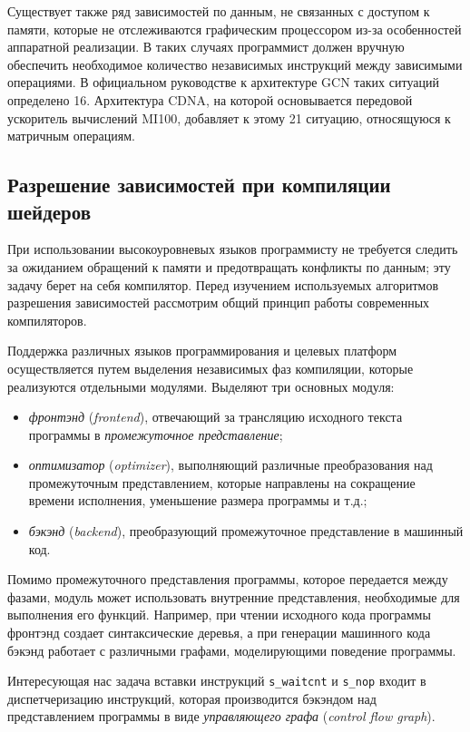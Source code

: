 \documentclass[a4paper,14pt]{extarticle}
\newenvironment{ul}{\begin{itemize}[noitemsep,topsep=0em]}{\end{itemize}\vspace{20pt}}
\begin{document}
Существует также ряд зависимостей по данным, не связанных с доступом к памяти,
которые не отслеживаются графическим процессором из-за особенностей аппаратной реализации.
В таких случаях программист должен вручную обеспечить необходимое количество независимых
инструкций между зависимыми операциями. В официальном руководстве к архитектуре GCN
таких ситуаций определено 16\cite{vega-isa}. Архитектура CDNA, на которой основывается передовой ускоритель
вычислений MI100, добавляет к этому 21 ситуацию, относящуюся к матричным операциям\cite{cdna-isa}.

\subsection{Разрешение зависимостей при компиляции шейдеров}

При использовании высокоуровневых языков программисту не требуется следить
за ожиданием обращений к памяти и предотвращать конфликты по данным;
эту задачу берет на себя компилятор. Перед изучением используемых алгоритмов
разрешения зависимостей рассмотрим общий принцип работы современных компиляторов.

Поддержка различных языков программирования и целевых платформ осуществляется
путем выделения независимых фаз компиляции, которые реализуются отдельными модулями.
Выделяют три основных модуля\cite[Глава~1]{compilers}:

\begin{ul}
\item \textit{фронтэнд} (\textit{frontend}), отвечающий за трансляцию исходного текста программы в
  \textit{промежуточное представление};
\item \textit{оптимизатор} (\textit{optimizer}), выполняющий различные преобразования над промежуточным
  представлением, которые направлены на сокращение времени исполнения,
  уменьшение размера программы и т.д.;
\item \textit{бэкэнд} (\textit{backend}), преобразующий промежуточное представление в машинный код.
\end{ul}

Помимо промежуточного представления программы, которое передается между фазами,
модуль может использовать внутренние представления, необходимые для выполнения его функций.
Например, при чтении исходного кода программы фронтэнд создает синтаксические деревья,
а при генерации машинного кода бэкэнд работает с различными графами, моделирующими поведение
программы.

Интересующая нас задача вставки инструкций \texttt{s\_waitcnt} и \texttt{s\_nop} входит
в диспетчеризацию инструкций, которая производится бэкэндом над представлением программы
в виде \textit{управляющего графа} (\textit{control flow graph}).
\end{document}

